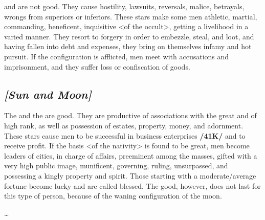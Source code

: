 \Mercury\xspace and \Mars\xspace are not good. They cause hostility, lawsuits, reversals, malice, betrayals, wrongs
from superiors or inferiors. These stars make some men athletic, martial, commanding, beneficent, inquisitive <of the occult>, getting a livelihood in a varied manner. They resort to forgery in order to embezzle, steal, and loot, and having fallen into debt and expenses, they bring on themselves infamy and hot pursuit. If the configuration is afflicted, men meet with accusations and imprisonment, and they suffer
loss or confiscation of goods.

\secbr
\subsection{\textit{[Sun and Moon]}}
The \Sun\xspace and the \Moon\xspace are good. They are productive of associations with the great and of high rank,
as well as possession of estates, property, money, and adornment. These stars cause men to be successful in business enterprises \textbf{/41K/} and to receive profit. If the basis <of the nativity> is found to be great, men become leaders of cities, in charge of affairs, preeminent among the masses, gifted with a very high public image, munificent, governing, ruling, unsurpassed, and possessing a kingly property and spirit. Those starting with a moderate/average fortune become lucky and are called blessed. The good, however, does not last for this type of person, because of the waning configuration of the moon. 

\ldots


\newpage